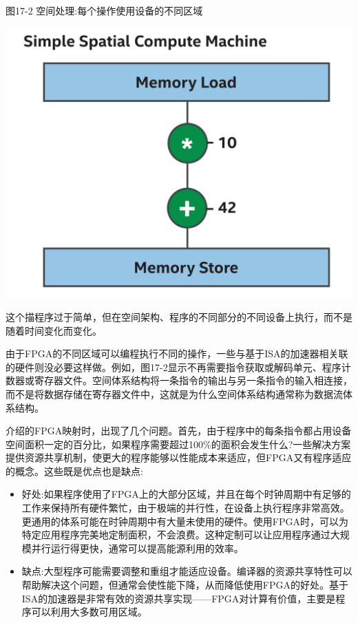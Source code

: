\hspace*{\fill} \par %
图17-2 空间处理:每个操作使用设备的不同区域
\begin{center}
	\includegraphics[width=1.0\textwidth]{content/chapter-17/images/3}
\end{center}

这个描程序过于简单，但在空间架构、程序的不同部分的不同设备上执行，而不是随着时间变化而变化。\par

由于FPGA的不同区域可以编程执行不同的操作，一些与基于ISA的加速器相关联的硬件则没必要这样做。例如，图17-2显示不再需要指令获取或解码单元、程序计数器或寄存器文件。空间体系结构将一条指令的输出与另一条指令的输入相连接，而不是将数据存储在寄存器文件中，这就是为什么空间体系结构通常称为数据流体系结构。\par

介绍的FPGA映射时，出现了几个问题。首先，由于程序中的每条指令都占用设备空间面积一定的百分比，如果程序需要超过100\%的面积会发生什么?一些解决方案提供资源共享机制，使更大的程序能够以性能成本来适应，但FPGA又有程序适应的概念。这些既是优点也是缺点:\par

\begin{itemize}
	\item 好处:如果程序使用了FPGA上的大部分区域，并且在每个时钟周期中有足够的工作来保持所有硬件繁忙，由于极端的并行性，在设备上执行程序非常高效。更通用的体系可能在时钟周期中有大量未使用的硬件。使用FPGA时，可以为特定应用程序完美地定制面积，不会浪费。这种定制可以让应用程序通过大规模并行运行得更快，通常可以提高能源利用的效率。
	\item 缺点:大型程序可能需要调整和重组才能适应设备。编译器的资源共享特性可以帮助解决这个问题，但通常会使性能下降，从而降低使用FPGA的好处。基于ISA的加速器是非常有效的资源共享实现——FPGA对计算有价值，主要是程序可以利用大多数可用区域。
\end{itemize}


